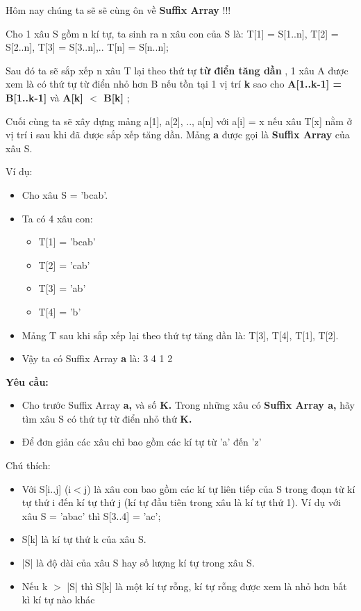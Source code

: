 



   Hôm nay chúng ta sẽ sẽ cùng ôn về   \textbf{     Suffix Array}   !!!  

   Cho 1 xâu S gồm n kí tự, ta sinh ra n xâu con của S là: T[1] = S[1..n], T[2] = S[2..n], T[3] = S[3..n],.. T[n] = S[n..n];  

   Sau đó ta sẽ sắp xếp n xâu T lại theo thứ tự   \textbf{    từ điển tăng dần   }   , 1 xâu A được xem là có thứ tự từ điển nhỏ hơn B nếu tồn tại 1 vị trí   \textbf{    k   }   sao cho   \textbf{    A[1..k-1] = B[1..k-1]   }   và   \textbf{    A[k] $<$ B[k]   }   ;  

   Cuối cùng ta sẽ xây dựng mảng a[1], a[2], .., a[n] với a[i] = x nếu xâu T[x] nằm ở vị trí i sau khi đã được sắp xếp tăng dần. Mảng   \textbf{    a   }   được gọi là   \textbf{     Suffix Array}   của xâu S.  

   Ví dụ:  
\begin{itemize}
	\item     Cho xâu S = 'bcab'.   
	\item     Ta có 4 xâu con:    
\begin{itemize}
	\item       T[1] = 'bcab'     
	\item       T[2] = 'cab'     
	\item       T[3] = 'ab'     
	\item       T[4] = 'b'     
\end{itemize}
	\item     Mảng T sau khi sắp xếp lại theo thứ tự tăng dần là: T[3], T[4], T[1], T[2].   
	\item     Vậy ta có Suffix Array    \textbf{     a    }    là: 3 4 1 2   
\end{itemize}
\begin{enumerate}
\end{enumerate}

\textbf{    Yêu cầu:   }
\begin{itemize}
	\item     Cho trước Suffix Array    \textbf{     a,    }    và số    \textbf{     K.    }    Trong những xâu có    \textbf{Suffix Array     a,    }    hãy tìm xâu S có thứ tự từ điển nhỏ thứ    \textbf{     K.    }
	\item     Để đơn giản các xâu chỉ bao gồm các kí tự từ 'a' đến 'z'   
\end{itemize}

   Chú thích:  
\begin{itemize}
	\item     Với S[i..j] (i$<$j) là xâu con bao gồm các kí tự liên tiếp của S trong đoạn từ kí tự thứ i đến kí tự thứ j (kí tự đầu tiên trong xâu là kí tự thứ 1). Ví dụ với xâu S = 'abac' thì S[3..4] = 'ac';   
	\item     S[k] là kí tự thứ k của xâu S.   
	\item     |S| là độ dài của xâu S hay số lượng kí tự trong xâu S.   
	\item     Nếu k $>$ |S| thì S[k] là một kí tự rỗng, kí tự rỗng được xem là nhỏ hơn bất kì kí tự nào khác   
\end{itemize}

